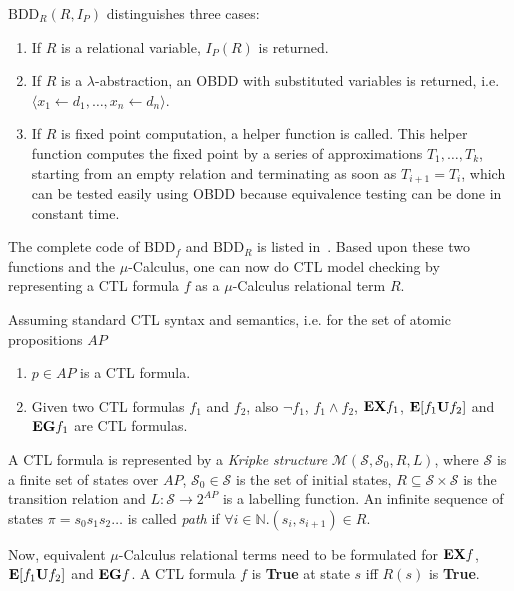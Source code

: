 \documentclass{vldb}
\begin{document}
$\text{BDD}_R \left( R, I_P \right)$ distinguishes three cases:
\begin{enumerate}
    \item{If $R$ is a relational variable, $I_P \left( R \right)$ is returned.}
    \item{
        If $R$ is a $\lambda$-abstraction, an OBDD with substituted variables is
        returned, i.e. $\langle x_1 \leftarrow d_1, \ldots, x_n \leftarrow d_n \rangle$.
    }
    \item{
        If $R$ is fixed point computation, a helper function is called. This
        helper function computes the fixed point by a series of approximations
        $T_1, \ldots, T_k$, starting from an empty relation and terminating as
        soon as $T_{i+1} = T_i$, which can be tested easily using OBDD because
        equivalence testing can be done in constant time.
    }
\end{enumerate}

The complete code of $\text{BDD}_f$ and $\text{BDD}_R$ is listed
in~\cite[p. 432]{BURCH90}. Based upon these two functions and the $\mu$-Calculus, one can now do CTL model
checking by representing a CTL formula $f$ as a $\mu$-Calculus relational term
$R$.

Assuming standard CTL syntax and semantics, i.e. for the set of atomic
propositions $AP$
\begin{enumerate}
    \item{$p \in AP$ is a CTL formula.}
    \item{
        Given two CTL formulas $f_1$ and $f_2$, also $\neg f_1$, $f_1 \land f_2$,
        $\text{\textbf{EX}} f_1$,
        $\text{\textbf{E}} \lbrack f_1 \text{\textbf{U}} f_2 \rbrack$ and
        $\text{\textbf{EG}} f_1$ are CTL formulas.
    }
\end{enumerate}

A CTL formula is represented by a \textit{Kripke structure} \newline
$\mathcal{M} \left( \mathcal{S}, \mathcal{S}_0, R, L \right)$, where $\mathcal{S}$
is a finite set of states over $AP$, $\mathcal{S}_0 \in \mathcal{S}$ is the set
of initial states, $R \subseteq \mathcal{S} \times \mathcal{S}$ is the transition
relation and $L: \mathcal{S} \rightarrow 2^{AP}$ is a labelling function. An
infinite sequence of states $\pi = s_0s_1s_2\ldots$ is called \textit{path} if
$\forall i \in \mathbb{N}.\left( s_i, s_{i+1} \right) \in R$.

Now, equivalent $\mu$-Calculus relational terms need to be formulated for
$\text{\textbf{EX}} f$,
$\text{\textbf{E}} \lbrack f_1 \text{\textbf{U}} f_2 \rbrack$ and
$\text{\textbf{EG}} f$. A CTL formula $f$ is \textbf{True} at state $s$ iff
$R \left( s \right)$ is \textbf{True}. 
\end{document}
